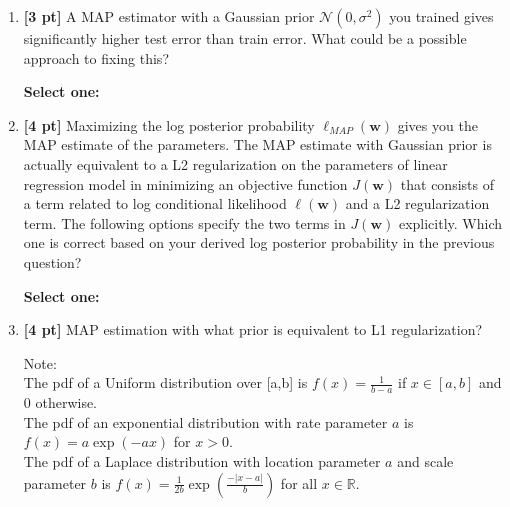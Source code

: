 \documentclass[12pt]{article}
\renewcommand{\circle}{\tikz\draw[black] (0,0) circle (1ex);}
\begin{document}
\begin{enumerate}
    
    \clearpage
    
    \item \textbf{[3 pt]} A MAP estimator with a Gaussian prior $\mathcal{N}(0, \sigma^2)$ you trained gives significantly higher test error than train error. What could be a possible approach to fixing this? 

    \textbf{Select one:}
    
    
    \item \textbf{[4 pt]} Maximizing the log posterior probability  $\ell_{\textit{MAP}}(\mathbf{w})$ gives you the MAP estimate of the parameters. The MAP estimate with Gaussian prior is actually equivalent to a L2 regularization on the parameters of linear regression model in minimizing an objective function $J(\mathbf{w})$ that consists of a term related to log conditional likelihood $\ell(\mathbf{w})$ and a L2 regularization term. The following options specify the two terms in $J(\mathbf{w})$ explicitly. Which one is correct based on your derived log posterior probability in the previous question? 

    \textbf{Select one:}
    
    
    \item \textbf{[4 pt]} MAP estimation with what prior is equivalent to L1 regularization? 

    Note:\\
    The pdf of a Uniform distribution over [a,b] is $f(x) = \frac{1}{b-a}$ if $x \in [a,b]$ and 0 otherwise.\\
    The pdf of an exponential distribution with rate parameter $a$ is $f(x) = a \exp(-a x)$ for $x > 0$.\\
    The pdf of a Laplace distribution with location parameter $a$ and scale parameter $b$  is $f(x) = \frac{1}{2b} \exp \left( \frac{- |x - a| }{b} \right)$ for all $x \in \mathbb{R}$.
    


\end{enumerate}
\end{document}
